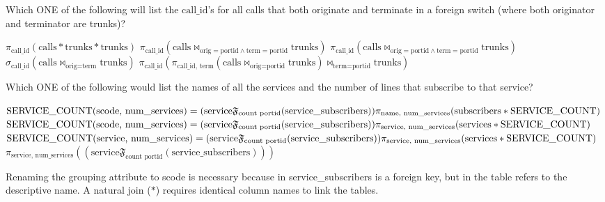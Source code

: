 \documentclass[12pt, answers]{exam}
\begin{document}
\begin{questions}
    \question[1] Which ONE of the following will list the $\text{call\_id}$'s for all calls that both originate and terminate in a foreign switch (where both originator and terminator are trunks)?
    \begin{choices}
        \choice $\pi_{\text{call\_id}}(\text{calls} * \text{trunks} * \text{trunks})$
        \choice $\pi_{\text{call\_id}}(\text{calls} \bowtie_{\text{orig}=\text{portid} \land \text{term}=\text{portid}} \text{trunks})$
        \choice $\pi_{\text{call\_id}} (\text{calls} \bowtie_{\text{orig}=\text{portid} \land \text{term}=\text{portid}} \text{trunks})$
        \choice $\sigma_{\text{call\_id}}(\text{calls} \bowtie_{\text{orig}=\text{term}} \text{trunks})$
        \CorrectChoice $\pi_{\text{call\_id}} (\pi_{\text{call\_id, term}}(\text{calls} \bowtie_{\text{orig}=\text{portid}} \text{trunks}) \bowtie_{\text{term}=\text{portid}} \text{trunks})$
    \end{choices}

    \question[1] Which ONE of the following would list the names of all the services and the number of lines that subscribe to that service?
    \begin{choices}
        \choice $\text{SERVICE\_COUNT}(\text{scode, num\_services}) = \newline
        (\text{service} \mathfrak{F}_{\text{count portid}}(\text{service\_subscribers})) \\ \pi_{\text{name, num\_services}}(\text{subscribers} * \text{SERVICE\_COUNT})$
        \CorrectChoice $\text{SERVICE\_COUNT}(\text{scode, num\_services}) = \newline
        (\text{service} \mathfrak{F}_{\text{count portid}}(\text{service\_subscribers})) \\ \pi_{\text{service, num\_services}}(\text{services} * \text{SERVICE\_COUNT})$
        \choice $\text{SERVICE\_COUNT}(\text{service, num\_services}) = \newline
        (\text{service} \mathfrak{F}_{\text{count portid}}(\text{service\_subscribers})) \\ \pi_{\text{service, num\_services}}(\text{services} * \text{SERVICE\_COUNT})$
        \choice $\pi_{\text{service, num\_services}} ((\text{service} \mathfrak{F}_{\text{count portid}}(\text{service\_subscribers})))$
    \end{choices}
    \begin{solution}
        Renaming the grouping attribute to scode is necessary because  in service\_subscribers is a foreign key, but  in the  table refers to the descriptive name. A natural join ($*$) requires identical column names to link the tables.
    \end{solution}


\end{questions}
\end{document}
